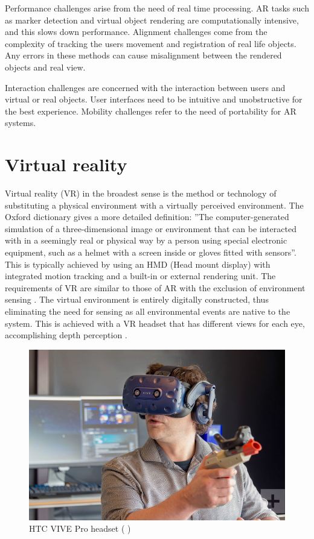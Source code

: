 \documentclass[12pt, a4paper,oneside, nocenter]{thesis}
\renewcommand{\citeyearpar}[1]{(\citeauthor{#1} \citeyear{#1})}
\begin{document}
Performance challenges arise from the need of real time processing. AR tasks such as marker detection
and virtual object rendering are computationally intensive, and this slows down performance.
Alignment challenges come from the complexity of tracking the users movement and registration of real
life objects. Any errors in these methods can cause misalignment between the rendered objects and
real view.\par
Interaction challenges are concerned with the interaction between users and virtual or real objects.
User interfaces need to be intuitive and unobstructive for the best experience. Mobility challenges refer
to the need of portability for AR systems.
\\
\section{Virtual reality}
Virtual reality (VR) in the broadest sense is the method or technology of substituting a physical environment with a virtually perceived environment. The Oxford dictionary gives a more detailed definition: 
''The computer-generated simulation of a three-dimensional image or environment that can be interacted with in a seemingly real or physical way by a person using special electronic equipment, such as a helmet with a screen inside or gloves fitted with sensors''.
This is typically achieved by using an HMD (Head mount display) with integrated motion tracking and a built-in or external rendering unit.
The requirements of VR are similar to those of AR with the exclusion of environment sensing . The virtual environment
is entirely digitally constructed, thus eliminating the need for sensing as all environmental events are native to the system. This is achieved with a VR headset that has different views for each eye, accomplishing depth perception .
\begin{figure}[H]
	\includegraphics[width=\textwidth]{htc-vive-pro-headset}
	\caption{HTC VIVE Pro headset \citeyearpar{htc-vive-pro-review}}
	\label{fig:htc-vive-pro-headset}
\end{figure}
\end{document}
